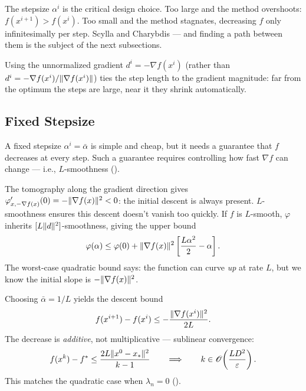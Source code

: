 The stepsize $\alpha^i$ is the critical design choice.
Too large and the method overshoots: $f(x^{i+1}) > f(x^i)$.
Too small and the method stagnates, decreasing $f$ only infinitesimally per step.
Scylla and Charybdis --- and finding a path between them is the subject of the next subsections.

Using the unnormalized gradient $d^i = -\nabla f(x^i)$ (rather than $d^i = -\nabla f(x^i)/\lVert\nabla f(x^i)\rVert$) ties the step length to the gradient magnitude: far from the optimum the steps are large, near it they shrink automatically.


\subsection{Fixed Stepsize}\label{ssec:fixed-stepsize}

A fixed stepsize $\alpha^i = \bar{\alpha}$ is simple and cheap, but it needs a guarantee that $f$ decreases at every step.
Such a guarantee requires controlling how fast $\nabla f$ can change --- i.e., $L$-smoothness ().

The tomography along the gradient direction gives $\varphi'_{x,-\nabla f(x)}(0) = -\lVert\nabla f(x)\rVert^2 < 0$: the initial descent is always present.
$L$-smoothness ensures this descent doesn't vanish too quickly.
If $f$ is $L$-smooth, $\varphi$ inherits $[L\lVert d\rVert^2]$-smoothness, giving the upper bound
\begin{equation}\label{eq:tomography-upper-bound}
	\varphi(\alpha) \leq \varphi(0) + \lVert\nabla f(x)\rVert^2 \left[\frac{L\alpha^2}{2} - \alpha\right].
\end{equation}
The worst-case quadratic bound says: the function can curve \emph{up} at rate $L$, but we know the initial slope is $-\lVert\nabla f(x)\rVert^2$.

Choosing $\bar{\alpha} = 1/L$ yields the descent bound
\begin{equation}\label{eq:fixed-step-descent}
	f(x^{i+1}) - f(x^i) \leq -\frac{\lVert\nabla f(x^i)\rVert^2}{2L}.
\end{equation}
The decrease is \emph{additive}, not multiplicative --- sublinear convergence:
\begin{equation}\label{eq:sublinear-smooth}
	f(x^k) - f^* \leq \frac{2L\lVert x^0 - x_*\rVert^2}{k - 1}
	\qquad \Longrightarrow \qquad
	k \in \mathcal{O}\!\left(\frac{LD^2}{\varepsilon}\right).
\end{equation}
This matches the quadratic case when $\lambda_n = 0$ ().

